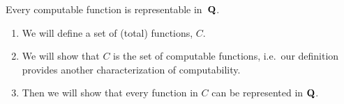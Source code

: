 \documentclass[../../include/open-logic-section]{subfiles}
\begin{document}

\begin{lem}
Every computable function is representable in~$\mathbf{Q}$.
\end{lem}

\begin{enumerate}
\item We will define a set of (total) functions, $C$.
\item We will show that $C$ is the set of computable
  functions, i.e.\ our definition provides another characterization of
  computability.
\item Then we will show that every function in $C$ can be represented in
  $\mathbf{Q}$.
\end{enumerate}
\end{document}
